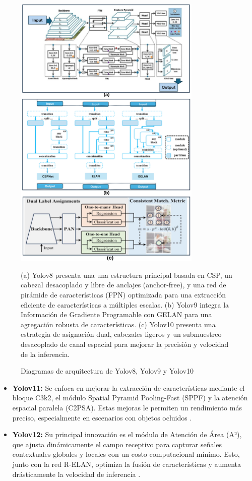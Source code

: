 \documentclass[12pt,a4paper,onecolumn,oneside]{report}
\begin{document}
\begin{figure}[htbp]
  \centering
  \includegraphics[width=0.8\textwidth]{figuras/arquitecture YOLO/v8_v9_v10.png}
  \caption{Diagramas de arquitectura de Yolov8, Yolov9 y Yolov10}
  \label{fig:Yolov8_v9_v10_arquitectures}
  (a) Yolov8 presenta una una estructura principal basada en CSP, un cabezal desacoplado y libre de anclajes (anchor-free), y una red de pirámide de características (FPN) optimizada para una extracción eficiente de características a múltiples escalas. 
  (b) Yolov9 integra la Información de Gradiente Programable con GELAN para una agregación robusta de características.
  (c) Yolov10 presenta una estrategia de asignación dual, cabezales ligeros y un submuestreo desacoplado de canal espacial para mejorar la precisión y velocidad de la inferencia.
\end{figure}

\begin{itemize}
  \item \textbf{Yolov11:} Se enfoca en mejorar la extracción de características mediante el bloque C3k2, el módulo Spatial Pyramid Pooling-Fast (SPPF) y la atención espacial paralela (C2PSA). Estas mejoras le permiten un rendimiento más preciso, especialmente en escenarios con objetos ocluidos \cite{defyolos}.
  \item \textbf{Yolov12:} Su principal innovación es el módulo de Atención de Área (A²), que ajusta dinámicamente el campo receptivo para capturar señales contextuales globales y locales con un costo computacional mínimo. Esto, junto con la red R-ELAN, optimiza la fusión de características y aumenta drásticamente la velocidad de inferencia \cite{defyolos}.
\end{itemize}
\end{document}
